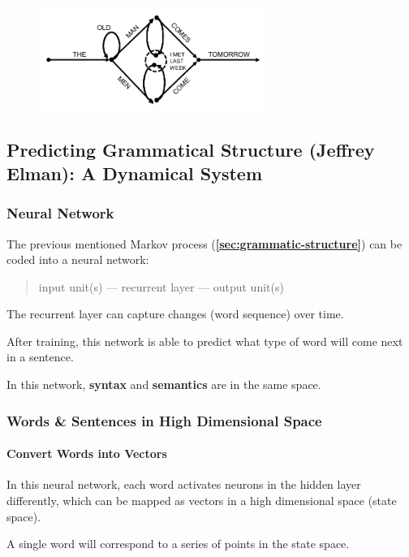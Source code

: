 \documentclass[a4paper, openany]{book}
\begin{document}
\begin{figure}[htbp]
  \centering
  \includegraphics[width=20em]{assets/GrammaticStructure1.png}
\end{figure}

\subsection{Predicting Grammatical Structure (Jeffrey Elman): A Dynamical System}

\subsubsection{Neural Network}

The previous mentioned Markov process (\textbf{\cref{sec:grammatic-structure}}) can be coded into a neural network:

\begin{quote}
  input unit(s) --- recurrent layer --- output unit(s)
\end{quote}

The recurrent layer can capture changes (word sequence) over time.

After training, this network is able to predict what type of word will come next in a sentence.

In this network, \textbf{syntax} and \textbf{semantics} are in the same space.

\subsubsection{Words \& Sentences in High Dimensional Space}

\paragraph{Convert Words into Vectors}

In this neural network, each word activates neurons in the hidden layer differently, which can be mapped as vectors in a high dimensional space (state space).

A single word will correspond to a series of points in the state space.
\end{document}
